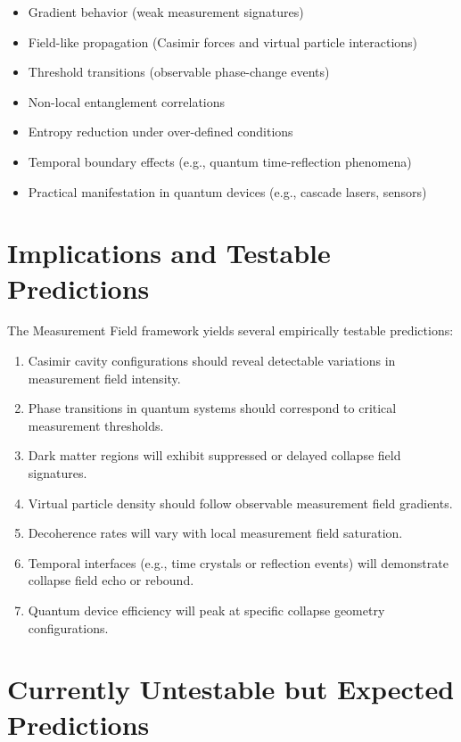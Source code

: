 \begin{itemize}
  \item Gradient behavior (weak measurement signatures)
  \item Field-like propagation (Casimir forces and virtual particle interactions)
  \item Threshold transitions (observable phase-change events)
  \item Non-local entanglement correlations
  \item Entropy reduction under over-defined conditions
  \item Temporal boundary effects (e.g., quantum time-reflection phenomena)
  \item Practical manifestation in quantum devices (e.g., cascade lasers, sensors)
\end{itemize}

\section{Implications and Testable Predictions}

The Measurement Field framework yields several empirically testable predictions:

\begin{enumerate}
  \item Casimir cavity configurations should reveal detectable variations in measurement field intensity.
  \item Phase transitions in quantum systems should correspond to critical measurement thresholds.
  \item Dark matter regions will exhibit suppressed or delayed collapse field signatures.
  \item Virtual particle density should follow observable measurement field gradients.
  \item Decoherence rates will vary with local measurement field saturation.
  \item Temporal interfaces (e.g., time crystals or reflection events) will demonstrate collapse field echo or rebound.
  \item Quantum device efficiency will peak at specific collapse geometry configurations.
\end{enumerate}

\section{Currently Untestable but Expected Predictions}

